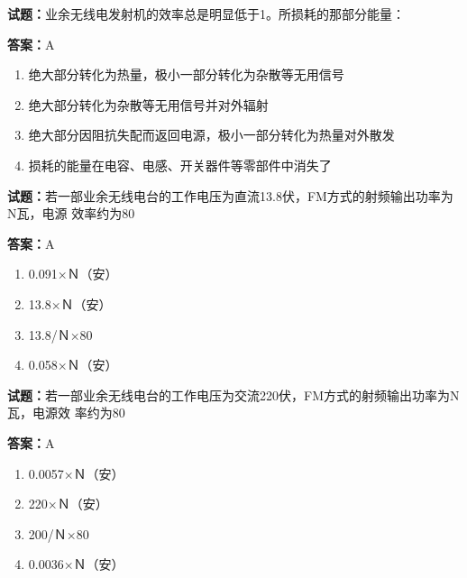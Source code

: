\documentclass{ctexbook}
\begin{document}
\textbf{试题：}业余无线电发射机的效率总是明显低于1。所损耗的那部分能量： 

\textbf{答案：}A 

\begin{enumerate}[leftmargin=3em]
  \item 绝大部分转化为热量，极小一部分转化为杂散等无用信号 

  \item 绝大部分转化为杂散等无用信号并对外辐射 

  \item 绝大部分因阻抗失配而返回电源，极小一部分转化为热量对外散发 

  \item 损耗的能量在电容、电感、开关器件等零部件中消失了 

\end{enumerate}





\vspace{1em}

\textbf{试题：}若一部业余无线电台的工作电压为直流13.8伏，FM方式的射频输出功率为N瓦，电源
效率约为80%

\textbf{答案：}A 

\begin{enumerate}[leftmargin=3em]
  \item 0.091×Ｎ（安） 

  \item 13.8×Ｎ（安） 

  \item 13.8/Ｎ×80%

  \item 0.058×Ｎ（安） 

\end{enumerate}






\vspace{1em}

\textbf{试题：}若一部业余无线电台的工作电压为交流220伏，FM方式的射频输出功率为N瓦，电源效
率约为80%

\textbf{答案：}A 

\begin{enumerate}[leftmargin=3em]
  \item 0.0057×Ｎ（安） 

  \item 220×Ｎ（安） 

  \item 200/Ｎ×80%

  \item 0.0036×Ｎ（安） 

\end{enumerate}
\end{document}
